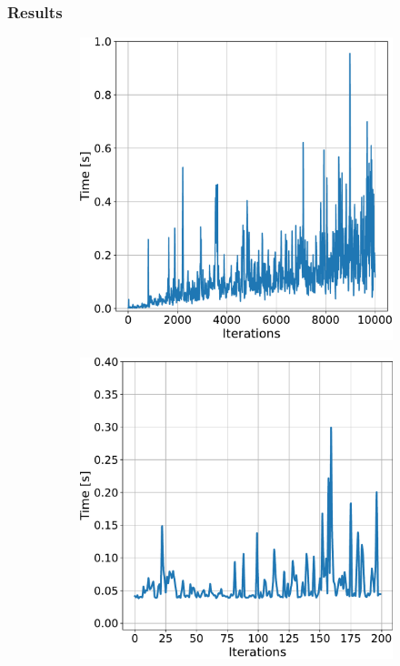 \documentclass{beamer}
\begin{document}

\begin{frame}
	\frametitle{Results}	
	\begin{figure}[!ht]
		\centering  
		\begin{subfigure}[t]{0.49\textwidth}
			\includegraphics[width=\textwidth]{figChap5/graph_E_2D_learning_time.pdf}    
		  \end{subfigure} 
		  \begin{subfigure}[t]{0.49\textwidth}
			\includegraphics[width=\textwidth]{figChap5/graph_6D_learning.pdf}    

\end{subfigure}
\end{figure}
\end{frame}
\end{document}
